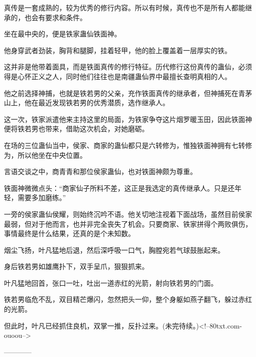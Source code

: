 \begin{this_body}
真传是一套成熟的，较为优秀的修行内容。所以有时候，真传也不是所有人都能继承的，也会有要求和条件。

坐在最中央的，便是铁家蛊仙铁面神。

他身穿武者劲装，胸背和腿脚，挂着轻甲，他的脸上覆盖着一层厚实的铁。

这并非是他带着面具，而是铁面真传的修行特征。历代修行这份真传的蛊仙，必须得是心怀正义之人，同时他们往往也是南疆蛊仙界中最擅长查明真相的人。

他之前选择神捕，也就是铁若男的父亲，充作铁面真传的继承者，但神捕死在青茅山上，他在最近发现铁若男的优秀潜质，选作继承人。

这一次，铁家派遣他来主持这里的局面，为铁家争夺这片烟罗暖玉田，因此铁面神便将铁若男也带来，借助这次机会，对她磨砺。

在场的三位蛊仙当中，侯家、商家的蛊仙都只是六转修为，惟独铁面神拥有七转修为，所以他坐在中央位置。

言语交谈之中，商青青和那位侯家蛊仙，也对铁面神颇为尊重。

铁面神微微点头：“商家仙子所料不差，这正是我选定的真传继承人。只是还年轻，需要多加磨练。”

一旁的侯家蛊仙侯耀，则始终沉吟不语。他关切地注视着下面战场，虽然目前侯家最弱，但对于他而言，也并非完全丧失了机会。只要商家、铁家拼得个两败俱伤，事情最终是什么结果，还真的是个未知数。

烟尘飞扬，叶凡猛地后退，然后深呼吸一口气，胸膛宛若气球鼓胀起来。

身后铁若男如雄鹰扑下，双手呈爪，狠狠抓来。

叶凡猛地回首，张口一吐，吐出一道赤红的光箭，射向铁若男的门面。

铁若男临危不乱，双目精芒爆闪，忽然把头一仰，整个身躯如燕子翻飞，躲过赤红的光箭。

但此时，叶凡已经抓住良机，双掌一推，反扑过来。(未完待续。)<!--80txt.com-ouoou-->

------------

\end{this_body}

